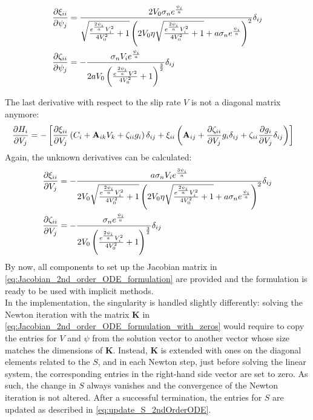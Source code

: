 \begin{align}
	\pdv{\xi_{ii}}{\psi_j} &= \frac{2V_0\sigma_n e^{\frac{\psi_i}{a}}}{\sqrt{\frac{e^{\frac{2\psi_i}{a}}V_i^2}{4V_0^2}+1}\left(2V_0\eta\sqrt{\frac{e^{\frac{2\psi_i}{a}}V_i^2}{4V_0^2}+1}+a\sigma_n e^{\frac{\psi_i}{a}}\right)^2}\delta_{ij} \\
	\pdv{\zeta_{ii}}{\psi_j} &= -\frac{\sigma_nV_ie^{\frac{\psi_i}{a}}}{2aV_0\left(\frac{e^{\frac{2\psi_i}{a}}V^2}{4V_0^2}+1\right)^{\frac{3}{2}}}\delta_{ij}
\end{align}

The last derivative with respect to the slip rate $V$ is not a diagonal matrix anymore:
\begin{align}
	\pdv{H_i}{V_j} &= -\left[\pdv{\xi_{ii}}{V_j}\left(C_i + \mathbf{A}_{ik}V_k + \zeta_{ii}g_i\right)\delta_{ij} + \xi_{ii}\left(\mathbf{A}_{ij} + \pdv{\zeta_{ii}}{V_j}g_i\delta_{ij} + \zeta_{ii}\pdv{g_i}{V_j}\delta_{ij}\right)\right]
\end{align}
Again, the unknown derivatives can be calculated:
\begin{align}
	\pdv{\xi_{ii}}{V_j} &= -\frac{a\sigma_n V_ie^{\frac{3\psi_i}{a}}}{2V_0\sqrt{\frac{e^{\frac{2\psi_i}{a}}V_i^2}{4V_0^2}+1}\left(2V_0\eta\sqrt{\frac{e^{\frac{2\psi_i}{a}}V_i^2}{4V_0^2}+1}+a\sigma_n e^{\frac{\psi_i}{a}}\right)^2}\delta_{ij} \\
	\pdv{\zeta_{ii}}{V_j} &= -\frac{\sigma_n e^{\frac{\psi_i}{a}}}{2V_0\left(\frac{e^{\frac{2\psi_i}{a}}V_i^2}{4V_0^2}+1\right)^{\frac{3}{2}}}\delta_{ij}
\end{align}
By now, all components to set up the Jacobian matrix in \autoref{eq:Jacobian_2nd_order_ODE_formulation} are provided and the formulation is ready to be used with implicit methods. \\
In the implementation, the singularity is handled slightly differently: solving the Newton iteration with the matrix $\mathbf{K}$ in \autoref{eq:Jacobian_2nd_order_ODE_formulation_with_zeros} would require to copy the entries for $V$ and $\psi$ from the solution vector to another vector whose size matches the dimensions of $\mathbf{K}$. Instead, $\mathbf{K}$ is extended with ones on the diagonal elements related to the $S$, and in each Newton step, just before solving the linear system, the corresponding entries in the right-hand side vector are set to zero. As such, the change in $S$ always vanishes and the convergence of the Newton iteration is not altered. After a successful termination, the entries for $S$ are updated as described in \autoref{eq:update_S_2ndOrderODE}.

